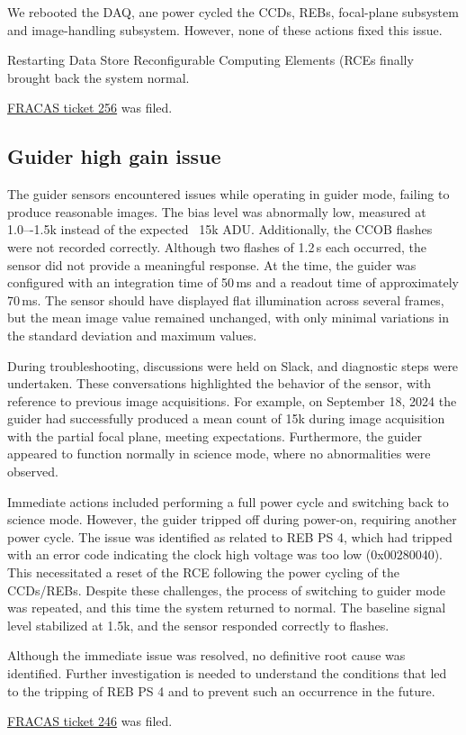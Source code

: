 We rebooted the DAQ, ane power cycled the CCDs, REBs, focal-plane subsystem and image-handling subsystem.  However, none of these actions fixed this issue.

Restarting Data Store Reconfigurable Computing Elements (RCEs finally brought back the system normal.

\href{https://rubinobs.atlassian.net/browse/FRACAS-256}{FRACAS ticket 256} was filed.

\clearpage
\subsection{Guider high gain issue}\label{sec:guider:highgain}

The guider sensors encountered issues while operating in guider mode, failing to produce reasonable images. The bias level was abnormally low, measured at 1.0–-1.5k instead of the expected ~15k ADU. Additionally, the CCOB flashes were not recorded correctly. Although two flashes of 1.2\,s each occurred, the sensor did not provide a meaningful response. At the time, the guider was configured with an integration time of 50\,ms and a readout time of approximately 70\,ms. The sensor should have displayed flat illumination across several frames, but the mean image value remained unchanged, with only minimal variations in the standard deviation and maximum values.

During troubleshooting, discussions were held on Slack, and diagnostic steps were undertaken. These conversations highlighted the behavior of the sensor, with reference to previous image acquisitions. For example, on September 18, 2024 the guider had successfully produced a mean count of 15k during image acquisition with the partial focal plane, meeting expectations. Furthermore, the guider appeared to function normally in science mode, where no abnormalities were observed.

Immediate actions included performing a full power cycle and switching back to science mode. However, the guider tripped off during power-on, requiring another power cycle. The issue was identified as related to REB PS 4, which had tripped with an error code indicating the clock high voltage was too low (0x00280040). This necessitated a reset of the RCE following the power cycling of the CCDs/REBs. Despite these challenges, the process of switching to guider mode was repeated, and this time the system returned to normal. The baseline signal level stabilized at 1.5k, and the sensor responded correctly to flashes.

Although the immediate issue was resolved, no definitive root cause was identified. Further investigation is needed to understand the conditions that led to the tripping of REB PS 4 and to prevent such an occurrence in the future.

\href{https://rubinobs.atlassian.net/browse/FRACAS-246}{FRACAS ticket 246} was filed.

\clearpage
